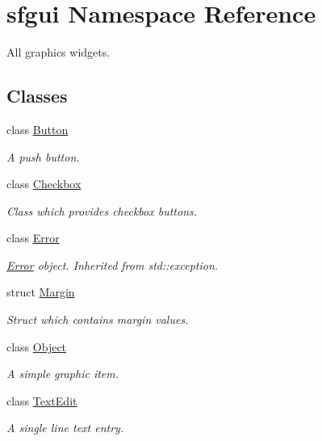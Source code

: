 \hypertarget{namespacesfgui}{
\section{sfgui Namespace Reference}
\label{namespacesfgui}
}
All graphics widgets.  


\subsection*{Classes}
\begin{CompactItemize}
\item 
class \hyperlink{classsfgui_1_1Button}{Button}
\begin{CompactList}\small\item\em A push button. \item\end{CompactList}\item 
class \hyperlink{classsfgui_1_1Checkbox}{Checkbox}
\begin{CompactList}\small\item\em Class which provides checkbox buttons. \item\end{CompactList}\item 
class \hyperlink{classsfgui_1_1Error}{Error}
\begin{CompactList}\small\item\em \hyperlink{classsfgui_1_1Error}{Error} object. Inherited from std::exception. \item\end{CompactList}\item 
struct \hyperlink{structsfgui_1_1Margin}{Margin}
\begin{CompactList}\small\item\em Struct which contains margin values. \item\end{CompactList}\item 
class \hyperlink{classsfgui_1_1Object}{Object}
\begin{CompactList}\small\item\em A simple graphic item. \item\end{CompactList}\item 
class \hyperlink{classsfgui_1_1TextEdit}{TextEdit}
\begin{CompactList}\small\item\em A single line text entry. \item\end{CompactList}\end{CompactItemize}
